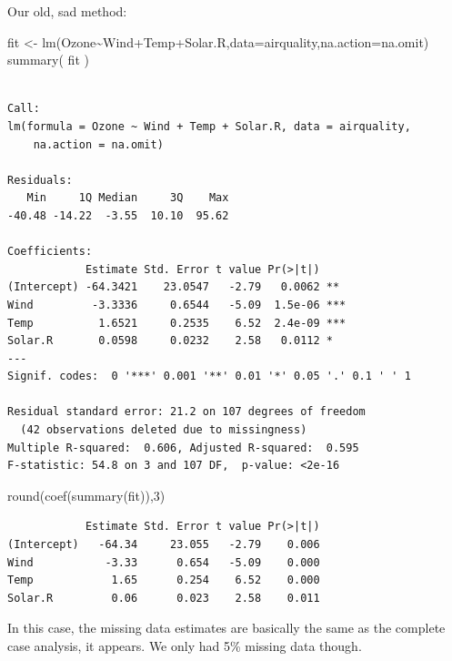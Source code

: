 \documentclass[
  letterpaper,
  DIV=11,
  numbers=noendperiod]{scrreprt}
\newenvironment{Shaded}{}{}
\newcommand{\AttributeTok}[1]{\textcolor[rgb]{0.49,0.56,0.16}{#1}}
\newcommand{\DecValTok}[1]{\textcolor[rgb]{0.25,0.63,0.44}{#1}}
\newcommand{\FunctionTok}[1]{\textcolor[rgb]{0.02,0.16,0.49}{#1}}
\newcommand{\NormalTok}[1]{#1}
\newcommand{\OtherTok}[1]{\textcolor[rgb]{0.00,0.44,0.13}{#1}}
\newcommand{\SpecialCharTok}[1]{\textcolor[rgb]{0.25,0.44,0.63}{#1}}
\begin{document}
Our old, sad method:

\begin{Shaded}
\begin{Highlighting}[]
\NormalTok{  fit }\OtherTok{\textless{}{-}} \FunctionTok{lm}\NormalTok{(Ozone}\SpecialCharTok{\textasciitilde{}}\NormalTok{Wind}\SpecialCharTok{+}\NormalTok{Temp}\SpecialCharTok{+}\NormalTok{Solar.R,}\AttributeTok{data=}\NormalTok{airquality,}\AttributeTok{na.action=}\NormalTok{na.omit)}
  \FunctionTok{summary}\NormalTok{( fit )}
\end{Highlighting}
\end{Shaded}

\begin{verbatim}

Call:
lm(formula = Ozone ~ Wind + Temp + Solar.R, data = airquality, 
    na.action = na.omit)

Residuals:
   Min     1Q Median     3Q    Max 
-40.48 -14.22  -3.55  10.10  95.62 

Coefficients:
            Estimate Std. Error t value Pr(>|t|)    
(Intercept) -64.3421    23.0547   -2.79   0.0062 ** 
Wind         -3.3336     0.6544   -5.09  1.5e-06 ***
Temp          1.6521     0.2535    6.52  2.4e-09 ***
Solar.R       0.0598     0.0232    2.58   0.0112 *  
---
Signif. codes:  0 '***' 0.001 '**' 0.01 '*' 0.05 '.' 0.1 ' ' 1

Residual standard error: 21.2 on 107 degrees of freedom
  (42 observations deleted due to missingness)
Multiple R-squared:  0.606, Adjusted R-squared:  0.595 
F-statistic: 54.8 on 3 and 107 DF,  p-value: <2e-16
\end{verbatim}

\begin{Shaded}
\begin{Highlighting}[]
  \FunctionTok{round}\NormalTok{(}\FunctionTok{coef}\NormalTok{(}\FunctionTok{summary}\NormalTok{(fit)),}\DecValTok{3}\NormalTok{)}
\end{Highlighting}
\end{Shaded}

\begin{verbatim}
            Estimate Std. Error t value Pr(>|t|)
(Intercept)   -64.34     23.055   -2.79    0.006
Wind           -3.33      0.654   -5.09    0.000
Temp            1.65      0.254    6.52    0.000
Solar.R         0.06      0.023    2.58    0.011
\end{verbatim}

In this case, the missing data estimates are basically the same as the
complete case analysis, it appears. We only had 5\% missing data though.
\end{document}
